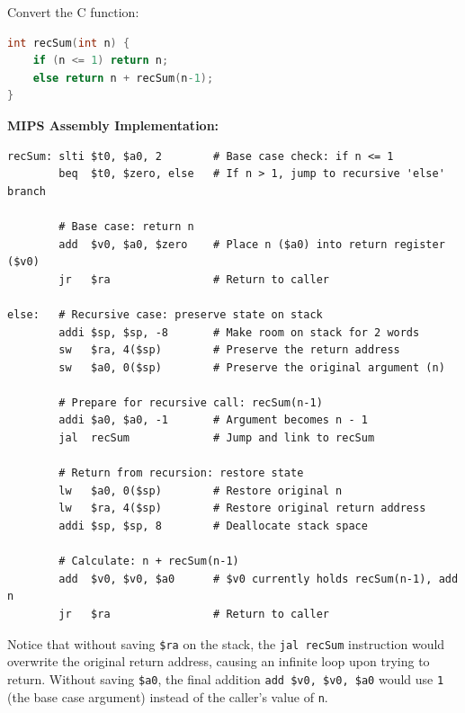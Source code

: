 \begin{example}
Convert the C function:

\vspace{10pt}
\begin{lstlisting}[language=C]
int recSum(int n) {
    if (n <= 1) return n;
    else return n + recSum(n-1);
}
\end{lstlisting}

\textbf{MIPS Assembly Implementation:}
\begin{lstlisting}
recSum: slti $t0, $a0, 2        # Base case check: if n <= 1
        beq  $t0, $zero, else   # If n > 1, jump to recursive 'else' branch
        
        # Base case: return n
        add  $v0, $a0, $zero    # Place n ($a0) into return register ($v0)
        jr   $ra                # Return to caller
        
else:   # Recursive case: preserve state on stack
        addi $sp, $sp, -8       # Make room on stack for 2 words
        sw   $ra, 4($sp)        # Preserve the return address
        sw   $a0, 0($sp)        # Preserve the original argument (n)
        
        # Prepare for recursive call: recSum(n-1)
        addi $a0, $a0, -1       # Argument becomes n - 1
        jal  recSum             # Jump and link to recSum
        
        # Return from recursion: restore state
        lw   $a0, 0($sp)        # Restore original n
        lw   $ra, 4($sp)        # Restore original return address
        addi $sp, $sp, 8        # Deallocate stack space
        
        # Calculate: n + recSum(n-1)
        add  $v0, $v0, $a0      # $v0 currently holds recSum(n-1), add n
        jr   $ra                # Return to caller
\end{lstlisting}
\end{example}

\begin{remark}
Notice that without saving \texttt{\$ra} on the stack, the \texttt{jal recSum} instruction would overwrite the original return address, causing an infinite loop upon trying to return. Without saving \texttt{\$a0}, the final addition \texttt{add \$v0, \$v0, \$a0} would use \texttt{1} (the base case argument) instead of the caller's value of \texttt{n}.
\end{remark}
